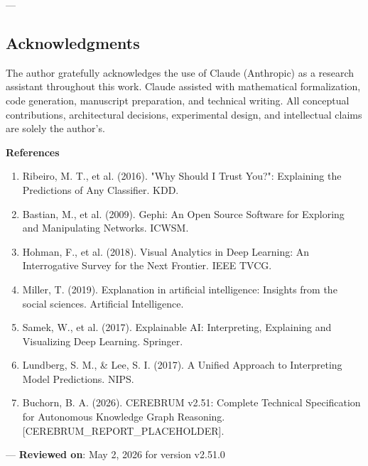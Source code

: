 ---
\subsection{Acknow\-ledgments}

The author gratefully ackno\-wledges the use of Claude (Anthropic) as a research assistant throughout this work. Claude assisted with mathe\-matical forma\-lization, code generation, manuscript preparation, and technical writing. All conceptual contr\-ibutions, archi\-tectural decisions, exper\-imental design, and intel\-lectual claims are solely the author's.

\textbf{References}
\begin{enumerate}
\item Ribeiro, M. T., et al. (2016). "Why Should I Trust You?": Explaining the Predictions of Any Classifier. KDD.
\item Bastian, M., et al. (2009). Gephi: An Open Source Software for Exploring and Manipu\-lating Networks. ICWSM.
\item Hohman, F., et al. (2018). Visual Analytics in Deep Learning: An Interr\-ogative Survey for the Next Frontier. IEEE TVCG.
\item Miller, T. (2019). Explanation in artificial intel\-ligence: Insights from the social sciences. Artificial Intell\-igence.
\item Samek, W., et al. (2017). Explainable AI: Interp\-reting, Explaining and Visualizing Deep Learning. Springer.
\item Lundberg, S. M., \& Lee, S. I. (2017). A Unified Approach to Interp\-reting Model Predictions. NIPS.
\item Buchorn, B. A. (2026). CEREBRUM v2.51: Complete Technical Specif\-ication for Autonomous Knowledge Graph Reasoning. [CEREBRUM\_REPORT\_PLACEHOLDER].

\end{enumerate}
---
\textbf{Reviewed on}: May 2, 2026 for version v2.51.0
